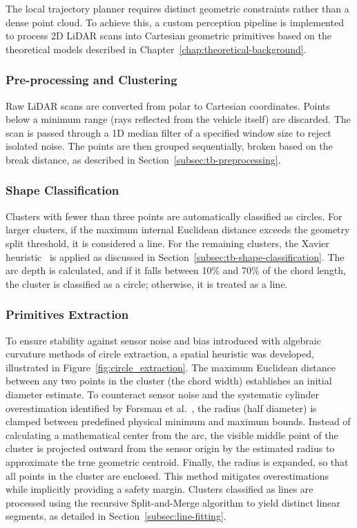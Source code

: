 The local trajectory planner requires distinct geometric constraints rather than a dense point cloud. To achieve this, a custom perception pipeline is implemented to process 2D LiDAR scans into Cartesian geometric primitives based on the theoretical models described in Chapter~\ref{chap:theoretical-background}.

\subsubsection{Pre-processing and Clustering}
\label{subsubsec:impl-preprocessing}
Raw LiDAR scans are converted from polar to Cartesian coordinates. Points below a minimum range (rays reflected from the vehicle itself) are discarded. The scan is passed through a 1D median filter of a specified window size to reject isolated noise. The points are then grouped sequentially, broken based on the break distance, as described in Section~\ref{subsec:tb-preprocessing}.

\subsubsection{Shape Classification}
\label{subsubsec:impl-shape-classification}
Clusters with fewer than three points are automatically classified as circles. For larger clusters, if the maximum internal Euclidean distance exceeds the geometry split threshold, it is considered a line. For the remaining clusters, the Xavier heuristic~\cite{xavier2005circledetection} is applied as discussed in Section~\ref{subsec:tb-shape-classification}. The arc depth is calculated, and if it falls between 10\% and 70\% of the chord length, the cluster is classified as a circle; otherwise, it is treated as a line.

\subsubsection{Primitives Extraction}
\label{subsubsec:impl-primitives}
To ensure stability against sensor noise and bias introduced with algebraic curvature methods of circle extraction, a spatial heuristic was developed, illustrated in Figure~\ref{fig:circle_extraction}. The maximum Euclidean distance between any two points in the cluster (the chord width) establishes an initial diameter estimate. To counteract sensor noise and the systematic cylinder overestimation identified by Forsman et al.~\cite{forsman2017bias}, the radius (half diameter) is clamped between predefined physical minimum and maximum bounds. Instead of calculating a mathematical center from the arc, the visible middle point of the cluster is projected outward from the sensor origin by the estimated radius to approximate the true geometric centroid. Finally, the radius is expanded, so that all points in the cluster are enclosed. This method mitigates overestimations while implicitly providing a safety margin. Clusters classified as lines are processed using the recursive Split-and-Merge algorithm to yield distinct linear segments, as detailed in Section~\ref{subsec:line-fitting}.

